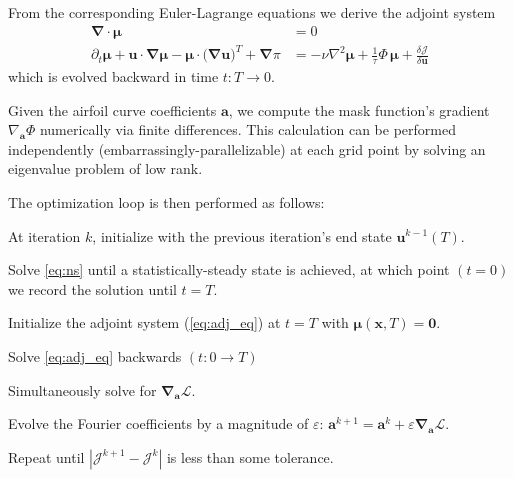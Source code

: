 \documentclass[11pt]{article}
\newenvironment{tight_enumerate}{
  \begin{enumerate}
    \setlength{\itemsep}{0pt}
    \setlength{\parskip}{0pt}
    }{\end{enumerate}}
\renewcommand{\vec}[1]{\boldsymbol{#1}}
\newcommand{\grad}{\vec{\nabla}}
\newcommand{\laplacian}{\nabla^2}
\begin{document}
From the corresponding Euler-Lagrange equations we derive the adjoint system
\begin{align}
  \grad \cdot \vec{\mu} &= 0 \\
  \partial_t\vec{\mu} + \vec{u}\cdot\grad\vec{\mu} - \vec{\mu}\cdot \big( \grad \vec{u} \big)^T + \grad \pi &= -\nu\laplacian\vec{\mu} + \frac{1}{\tau}\Phi\,\vec{\mu} + \frac{\delta \mathcal{J}}{\delta \vec{u}} \label{eq:adj_eq}
\end{align}
which is evolved backward in time $t:T\to 0$. \\ \newline

Given the airfoil curve coefficients $\vec{a}$, we compute the mask function's gradient $\nabla_{\vec{a}} \Phi$ numerically via finite differences. This calculation can be performed independently (embarrassingly-parallelizable) at each grid point by solving an eigenvalue problem of low rank.


The optimization loop is then performed as follows:
\begin{tight_enumerate}
  \item At iteration $k$, initialize with the previous iteration's end state $\vec{u}^{k-1}(T)$. 
  \item Solve \ref{eq:ns} until a statistically-steady state is achieved, at which point $(t=0)$ we record the solution until $t=T$.
  \item Initialize the adjoint system (\ref{eq:adj_eq}) at $t=T$ with $\vec{\mu}(\vec{x},T) = \vec{0}$.
  \item Solve \ref{eq:adj_eq} backwards $(t:0\to T)$
  \item Simultaneously solve for $\grad_{\vec{a}}{\mathcal{L}}$.
  \item Evolve the Fourier coefficients by a magnitude of $\varepsilon$: $\vec{a}^{k+1} = \vec{a}^k+\varepsilon \grad_{\vec{a}}\mathcal{L}$.
  \item Repeat until $|\mathcal{J}^{k+1} - \mathcal{J}^{k}|$ is less than some tolerance.
\end{tight_enumerate}
\end{document}

